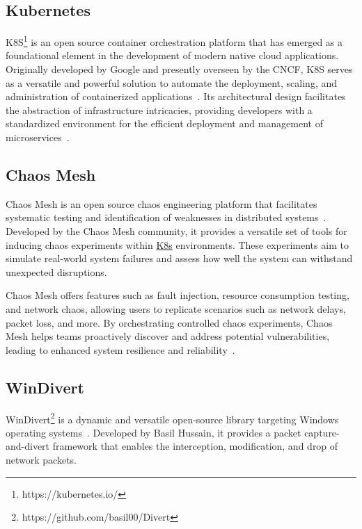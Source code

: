 \subsection{Kubernetes}
\label{subsec:kubernetes}
\acf{K8S}\footnote{https://kubernetes.io/} is an open source container orchestration platform that has emerged as a foundational element in the development of modern native cloud applications. Originally developed by Google and presently overseen by the \ac{CNCF}, \ac{K8S} serves as a versatile and powerful solution to automate the deployment, scaling, and administration of containerized applications~\cite{burns2022kubernetes}. Its architectural design facilitates the abstraction of infrastructure intricacies, providing developers with a standardized environment for the efficient deployment and management of microservices~\cite{noauthor_production-grade_nodate}.


\subsection{Chaos Mesh}
\label{subsec:chaosmesh}
Chaos Mesh is an open source chaos engineering platform that facilitates systematic testing and identification of weaknesses in distributed systems~\cite{noauthor_chaos_nodate}. Developed by the Chaos Mesh community, it provides a versatile set of tools for inducing chaos experiments within \hyperref[subsec:kubernetes]{K8s} environments. These experiments aim to simulate real-world system failures and assess how well the system can withstand unexpected disruptions.

Chaos Mesh offers features such as fault injection, resource consumption testing, and network chaos, allowing users to replicate scenarios such as network delays, packet loss, and more. By orchestrating controlled chaos experiments, Chaos Mesh helps teams proactively discover and address potential vulnerabilities, leading to enhanced system resilience and reliability~\cite{noauthor_chaos_nodate}.

\subsection{WinDivert}
\label{subsec:windivert}
WinDivert\footnote{https://github.com/basil00/Divert} is a dynamic and versatile open-source library targeting Windows operating systems~\cite{noauthor_windivert:_nodate}. Developed by Basil Hussain, it provides a packet capture-and-divert framework that enables the interception, modification, and drop of network packets.

